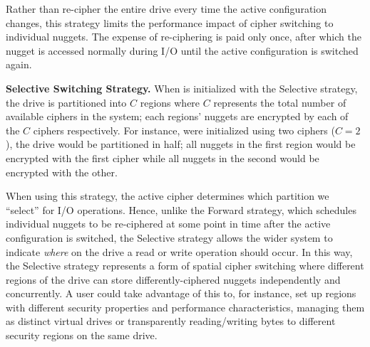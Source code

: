 Rather than re-cipher the entire drive every time the active configuration
changes, this strategy limits the performance impact of cipher switching to
individual nuggets. The expense of re-ciphering is paid only once, after which
the nugget is accessed normally during I/O until the active configuration is
switched again.


\textbf{Selective Switching Strategy.} When \sys is initialized with the
Selective strategy, the drive is partitioned into $C$ regions where $C$
represents the total number of available ciphers in the system; each regions'
nuggets are encrypted by each of the $C$ ciphers respectively. For instance,
were \sys initialized using two ciphers ($C = 2$), the drive would be
partitioned in half; all nuggets in the first region would be encrypted with the
first cipher while all nuggets in the second would be encrypted with the other.


When using this strategy, the active cipher determines which partition we
``select'' for I/O operations. Hence, unlike the Forward strategy, which
schedules individual nuggets to be re-ciphered at some point in time after the
active configuration is switched, the Selective strategy allows the wider system
to indicate \emph{where} on the drive a read or write operation should occur. In
this way, the Selective strategy represents a form of spatial cipher switching
where different regions of the drive can store differently-ciphered nuggets
independently and concurrently. A user could take advantage of this to, for
instance, set up regions with different security properties and performance
characteristics, managing them as distinct virtual drives or transparently
reading/writing bytes to different security regions on the same drive.

